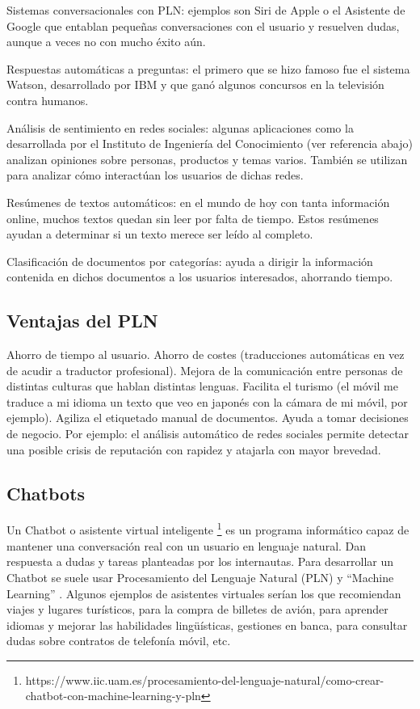 Sistemas conversacionales con PLN: ejemplos son Siri de Apple o el Asistente de Google que entablan pequeñas conversaciones con el usuario y resuelven dudas, aunque a veces no con mucho éxito aún.

Respuestas automáticas a preguntas: el primero que se hizo famoso fue el sistema Watson, desarrollado por IBM y que ganó algunos concursos en la televisión contra humanos.

Análisis de sentimiento en redes sociales: algunas aplicaciones como la desarrollada por el Instituto de Ingeniería del Conocimiento (ver referencia abajo) analizan opiniones sobre personas, productos y temas varios. También se utilizan para analizar cómo interactúan los usuarios de dichas redes.

Resúmenes de textos automáticos: en el mundo de hoy con tanta información online, muchos textos quedan sin leer por falta de tiempo. Estos resúmenes ayudan a determinar si un texto merece ser leído al completo. 

Clasificación de documentos por categorías: ayuda a dirigir la información contenida en dichos documentos a los usuarios interesados, ahorrando tiempo. 

\subsection{Ventajas del PLN}
Ahorro de tiempo al usuario.
Ahorro de costes (traducciones automáticas en vez de acudir a traductor profesional).
Mejora de la comunicación entre personas de distintas culturas que hablan distintas lenguas.
Facilita el turismo (el móvil me traduce a mi idioma un texto que veo en japonés con la cámara de mi móvil, por ejemplo).
Agiliza el etiquetado manual de documentos.
Ayuda a tomar decisiones de negocio. Por ejemplo: el análisis automático de redes sociales permite detectar una posible crisis de reputación con rapidez y atajarla con mayor brevedad.


\subsection{Chatbots}

Un Chatbot o asistente virtual inteligente \footnote{https://www.iic.uam.es/procesamiento-del-lenguaje-natural/como-crear-chatbot-con-machine-learning-y-pln} es un programa informático capaz de mantener una conversación real con un usuario en lenguaje natural. Dan respuesta a dudas y tareas planteadas por los internautas. Para desarrollar un Chatbot se suele usar Procesamiento del Lenguaje Natural (PLN) y ``Machine Learning'' .  Algunos ejemplos de asistentes virtuales serían los que recomiendan viajes y lugares turísticos, para la compra de billetes de avión, para aprender idiomas y mejorar las habilidades lingüísticas, gestiones en banca, para consultar dudas sobre contratos de telefonía móvil, etc.

